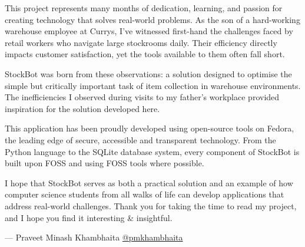 
\begin{preface}      


This project represents many months of dedication, learning, and passion for creating technology that solves real-world problems. As the son of a hard-working warehouse employee at Currys, I've witnessed first-hand the challenges faced by retail workers who navigate large stockrooms daily. Their efficiency directly impacts customer satisfaction, yet the tools available to them often fall short.

\textbf{}
\newline
StockBot was born from these observations: a solution designed to optimise the simple but critically important task of item collection in warehouse environments. The inefficiencies I observed during visits to my father's workplace provided inspiration for the solution developed here.

\textbf{}
\newline
This application has been proudly developed using open-source tools on Fedora, the leading edge of secure, accessible and transparent technology. From the Python language to the SQLite database system, every component of StockBot is built upon FOSS and using FOSS tools where possible.

\textbf{}
\newline
I hope that StockBot serves as both a practical solution and an example of how computer science students 
from all walks of life can develop applications that address real-world challenges. Thank you for taking the time to read my project, and I hope you find it interesting \& insightful.

\textbf{}
\newline
— Praveet Minash Khambhaita \newline
  \href{https://github.com/pmkhambhaita}{@pmkhambhaita}


\end{preface}

